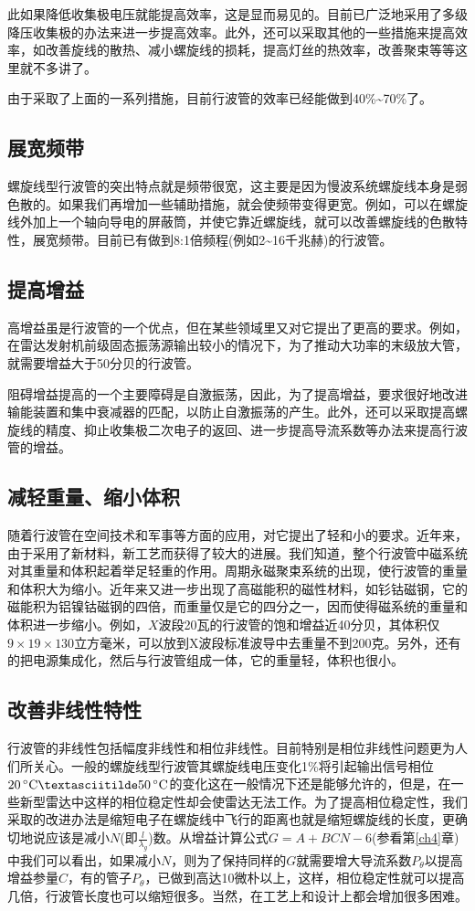 此如果降低收集极电压就能提高效率，这是显而易见的。目前已广泛地采用了多级降压收集极的办法来进一步提高效率。此外，还可以采取其他的一些措施来提高效率，如改善旋线的散热、减小螺旋线的损耗，提高灯丝的热效率，改善聚束等等这里就不多讲了。

由于采取了上面的一系列措施，目前行波管的效率已经能做到40\%\textasciitilde70\%了。
\subsection{展宽频带}
螺旋线型行波管的突出特点就是频带很宽，这主要是因为慢波系统螺旋线本身是弱色散的。如果我们再增加一些辅助措施，就会使频带变得更宽。例如，可以在螺旋线外加上一个轴向导电的屏蔽筒，并使它靠近螺旋线，就可以改善螺旋线的色散特性，展宽频带。目前已有做到8:1倍频程(例如2\textasciitilde16千兆赫)的行波管。
\subsection{提高增益}
高增益虽是行波管的一个优点，但在某些领域里又对它提出了更高的要求。例如，在雷达发射机前级固态振荡源输出较小的情况下，为了推动大功率的末级放大管，就需要增益大于50分贝的行波管。

阻碍增益提高的一个主要障碍是自激振荡，因此，为了提高增益，要求很好地改进输能装置和集中衰减器的匹配，以防止自激振荡的产生。此外，还可以采取提高螺旋线的精度、抑止收集极二次电子的返回、进一步提高导流系数等办法来提高行波管的增益。
\subsection{减轻重量、缩小体积}
随着行波管在空间技术和军事等方面的应用，对它提出了轻和小的要求。近年来，由于采用了新材料，新工艺而获得了较大的进展。我们知道，整个行波管中磁系统对其重量和体积起着举足轻重的作用。周期永磁聚束系统的出现，使行波管的重量和体积大为缩小。近年来又进一步出现了高磁能积的磁性材料，如钐钴磁钢，它的磁能积为铝镍钴磁钢的四倍，而重量仅是它的四分之一，因而使得磁系统的重量和体积进一步缩小。例如，$ X $波段20瓦的行波管的饱和增益近40分贝，其体积仅$ 9\times19\times130 $立方毫米，可以放到X波段标准波导中去重量不到200克。另外，还有的把电源集成化，然后与行波管组成一体，它的重量轻，体积也很小。
\subsection{改善非线性特性}
行波管的非线性包括幅度非线性和相位非线性。目前特别是相位非线性问题更为人们所关心。一般的螺旋线型行波管其螺旋线电压变化1\%将引起输出信号相位$ \SI{20}{\degreeCelsius}\textasciitilde\SI{50}{\degreeCelsius} $的变化这在一般情况下还是能够允许的，但是，在一些新型雷达中这样的相位稳定性却会使雷达无法工作。为了提高相位稳定性，我们采取的改进办法是缩短电子在螺旋线中飞行的距离也就是缩短螺旋线的长度，更确切地说应该是减小$ N $(即$ \frac{l}{\lambda_g} $)数。从增益计算公式$ G = A +\mathit{BCN}-6 $(参看第\ref{ch4}章)中我们可以看出，如果减小$ N $，则为了保持同样的$ G $就需要增大导流系数$ P_\theta $以提高增益参量$ C $，有的管子$ P_\theta $，已做到高达10微朴以上，这样，相位稳定性就可以提高几倍，行波管长度也可以缩短很多。当然，在工艺上和设计上都会增加很多困难。
